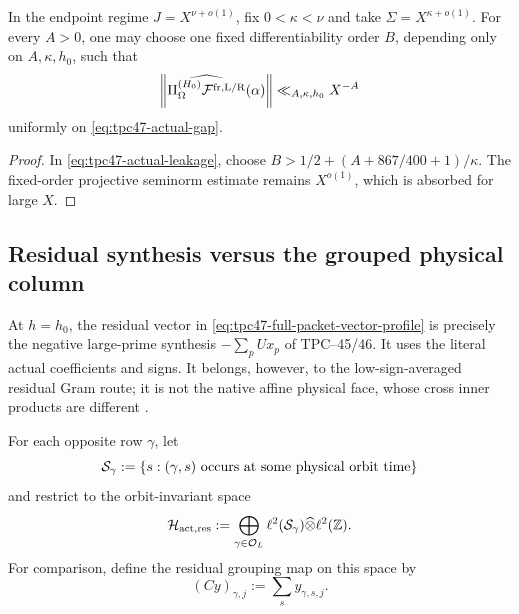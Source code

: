 \begin{corollary}
\label{cor:tpc47-arbitrary-power-leakage}
In the endpoint regime \(J=X^{\nu+o(1)}\), fix
\(0<\kappa<\nu\) and take \(\Sigma=X^{\kappa+o(1)}\).  For every
\(A>0\), one may choose one fixed differentiability order \(B\),
depending only on \(A,\kappa,h_0\), such that
\begin{equation}
 \left\|
 \widehat{\Pi_{\Omega}^{(H_0)}
 \mathcal F^{\rm fr,L/R}}(\alpha)
 \right\|\ll_{A,\kappa,h_0}X^{-A}
 \label{eq:tpc47-superpolynomial-leakage}
\end{equation}
uniformly on \eqref{eq:tpc47-actual-gap}.
\end{corollary}

\begin{proof}
In \eqref{eq:tpc47-actual-leakage}, choose
\(B>1/2+(A+867/400+1)/\kappa\).  The fixed-order projective
seminorm estimate remains \(X^{o(1)}\), which is absorbed for large
\(X\).
\end{proof}

\subsection{Residual synthesis versus the grouped physical column}

At \(h=h_0\), the residual vector in
\eqref{eq:tpc47-full-packet-vector-profile} is precisely the negative
large-prime synthesis \(-\sum_pUx_p\) of TPC--45/46.  It uses the
literal actual coefficients and signs.  It belongs, however, to the
low-sign-averaged residual Gram route; it is not the native affine
physical face, whose cross inner products are different
\citep{WangTPC45,WangTPC46}.

For each opposite row \(\gamma\), let
\begin{equation}
 \mathcal S_\gamma:=\{s:(\gamma,s)\text{ occurs at some physical orbit time}\}
 \label{eq:tpc47-active-residual-set}
\end{equation}
and restrict to the orbit-invariant space
\begin{equation}
 \mathcal H_{\rm act,res}
 :=\bigoplus_{\gamma\in\mathcal O_L}
 \ell^2(\mathcal S_\gamma)\widehat\otimes\ell^2(\mathbb Z).
 \label{eq:tpc47-active-residual-space}
\end{equation}
For comparison, define the residual grouping map on this space by
\begin{equation}
 (Cy)_{\gamma,j}:=\sum_s y_{\gamma,s,j}.
 \label{eq:tpc47-residual-grouping}
\end{equation}

